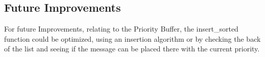 \begin{refsection}
\subsection{Future Improvements}
For future Improvements, relating to the Priority Buffer, the insert\_sorted 
function could be optimized, using an insertion algorithm or by checking the 
back of the list and seeing if the message can be placed there with the current 
priority.

\pagebreak

\clearpage

\cleardoublepage

\end{refsection}
